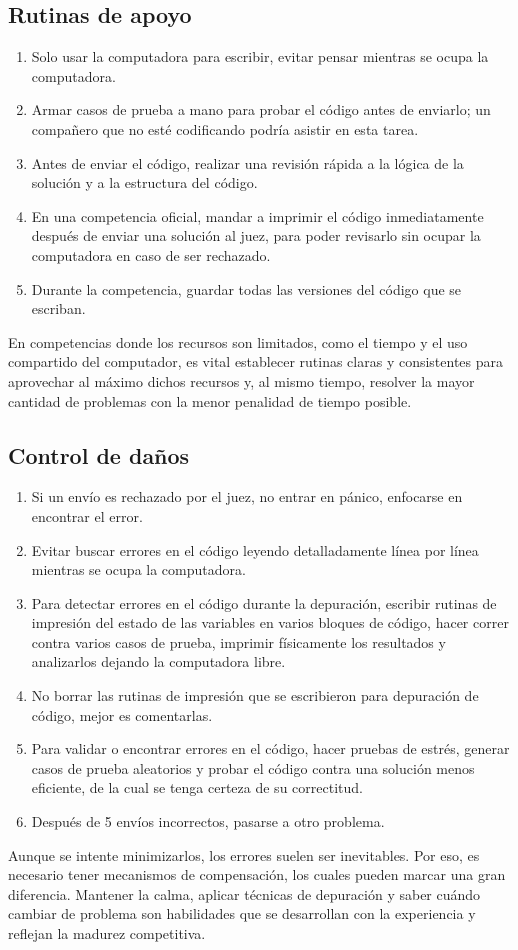 \subsection{Rutinas de apoyo}
\begin{enumerate}[resume=icpc]
    \item Solo usar la computadora para escribir, evitar pensar mientras se ocupa la computadora.
    \item Armar casos de prueba a mano para probar el código antes de enviarlo; un compañero que no esté codificando podría asistir en esta tarea.
    \item Antes de enviar el código, realizar una revisión rápida a la lógica de la solución y a la estructura del código.
    \item En una competencia oficial, mandar a imprimir el código inmediatamente después de enviar una solución al juez, para poder revisarlo sin ocupar la computadora en caso de ser rechazado.
    \item Durante la competencia, guardar todas las versiones del código que se escriban.
\end{enumerate}
En competencias donde los recursos son limitados, como el tiempo y el uso compartido del computador, es vital establecer rutinas claras y consistentes para aprovechar al máximo dichos recursos y, al mismo tiempo, resolver la mayor cantidad de problemas con la menor penalidad  de tiempo posible.
\pagebreak
\subsection{Control de daños}
\begin{enumerate}[resume=icpc]
    \item Si un envío es rechazado por el juez, no entrar en pánico, enfocarse en encontrar el error.
    \item Evitar buscar errores en el código leyendo detalladamente línea por línea mientras se ocupa la computadora.
    \item Para detectar errores en el código durante la depuración, escribir rutinas de impresión del estado de las variables en varios bloques de código, hacer correr contra varios casos de prueba, imprimir físicamente los resultados y analizarlos dejando la computadora libre.
    \item No borrar las rutinas de impresión que se escribieron para depuración de código, mejor es comentarlas.
    \item Para validar o encontrar errores en el código, hacer pruebas de estrés, generar casos de prueba aleatorios y probar el código contra una solución menos eficiente, de la cual se tenga certeza de su correctitud.
    \item Después de 5 envíos incorrectos, pasarse a otro problema.
\end{enumerate}
Aunque se intente minimizarlos, los errores suelen ser inevitables. Por eso, es necesario tener mecanismos de compensación, los cuales pueden marcar una gran diferencia. Mantener la calma, aplicar técnicas de depuración y saber cuándo cambiar de problema son habilidades que se desarrollan con la experiencia y reflejan la madurez competitiva.\\

